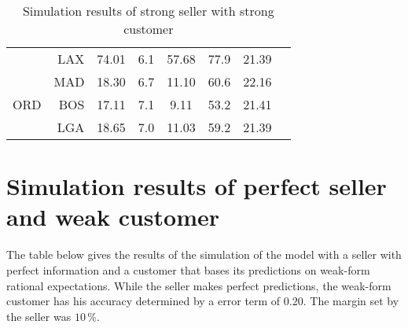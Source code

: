 \begin{table}[h]
\begin{center}
\begin{tabular}{l r c c c c c c}
     &  LAX &   74.01  &     6.1  &   57.68  &    77.9  &   21.39  \\
     &  MAD &   18.30  &     6.7  &   11.10  &    60.6  &   22.16  \\[.5ex]
ORD  &  BOS &   17.11  &     7.1  &    9.11  &    53.2  &   21.41  \\
     &  LGA &   18.65  &     7.0  &   11.03  &    59.2  &   21.39  \\
            \bottomrule
        \end{tabular}
        \caption{Simulation results of strong seller with strong customer}
        \label{tbl:resultsStrongStrong}
    \end{center}
\end{table}




\chapter{Simulation results of perfect seller and weak customer}
\label{app:SimulationResultsPerfectWeak}
The table below gives the results of the simulation of the model with a seller with perfect information and a customer that bases its predictions on weak-form rational expectations. While the seller makes perfect predictions, the weak-form customer has his accuracy determined by a error term of $0.20$. The margin set by the seller was $10\,\%$.

